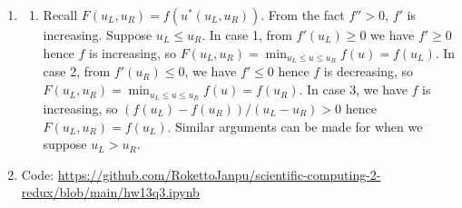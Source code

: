 \documentclass{article}
\begin{document}
\begin{enumerate}
\item

\begin{enumerate}
	
	
	\item Recall $F(u_L,u_R)=f(u^*(u_L,u_R))$. From the fact $f''>0$, $f'$ is increasing. Suppose $u_L\le u_R$. In case 1, from $f'(u_L)\ge0$ we have $f'\ge0$ hence $f$ is increasing, so $F(u_L,u_R)=\min_{u_L\le u\le u_R}f(u)=f(u_L)$. In case 2, from $f'(u_R)\le0$, we have $f'\le0$ hence $f$ is decreasing, so $F(u_L,u_R)=\min_{u_L\le u\le u_R}f(u)=f(u_R)$. In case 3, we have $f$ is increasing, so $(f(u_L)-f(u_R))/(u_L-u_R)>0$ hence $F(u_L,u_R)=f(u_L)$. Similar arguments can be made for when we suppose $u_L>u_R$.
	
	
\end{enumerate}



\item Code: \url{https://github.com/RokettoJanpu/scientific-computing-2-redux/blob/main/hw13q3.ipynb}


\end{enumerate}
\end{document}

